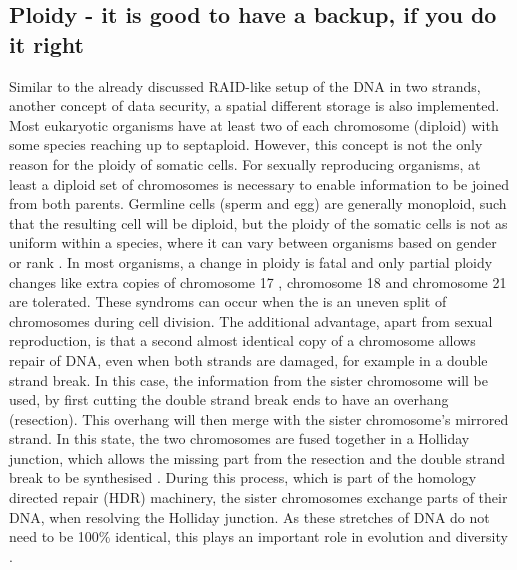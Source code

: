 \subsection[Ploidy]{Ploidy - it is good to have a backup, if you do it right}
\label{intro-sec:ploidy}
Similar to the already discussed RAID-like setup of the DNA in two strands, another concept of data security, a spatial different storage is also implemented. Most eukaryotic organisms have at least two of each chromosome (diploid) with some species reaching up to septaploid\cite{Tateoka1975}. However, this concept is not the only reason for the ploidy of somatic cells. For sexually reproducing organisms, at least a diploid set of chromosomes is necessary to enable information to be joined from both parents. Germline cells (sperm and egg) are generally monoploid, such that the resulting cell will be diploid, but the ploidy of the somatic cells is not as uniform within a species, where it can vary between organisms based on gender or rank \cite{Trivers1976}. 
In most organisms, a change in ploidy is fatal \cite{Otto2007} and only partial ploidy changes like extra copies of chromosome 17 \cite{Gottlieb1962}, chromosome 18 \cite{Cereda2012} and chromosome 21 \cite{Hulten2008} are tolerated. These syndroms can occur when the is an uneven split of chromosomes during cell division.
The additional advantage, apart from sexual reproduction, is that a second almost identical copy of a chromosome allows repair of DNA, even when both strands are damaged, for example in a double strand break.
In this case, the information from the sister chromosome will be used, by first cutting the double strand break ends to have an overhang (resection). This overhang will then merge with the sister chromosome's mirrored strand. In this state, the two chromosomes are fused together in a Holliday junction, which allows the missing part from the resection and the double strand break to be synthesised \cite{Lilley2000}. During this process, which is part of the homology directed repair (HDR) machinery, the sister chromosomes exchange parts of their DNA, when resolving the Holliday junction. As these stretches of DNA do not need to be 100\% identical, this plays an important role in evolution and diversity \cite{Hanage2006,Kong2013}.

